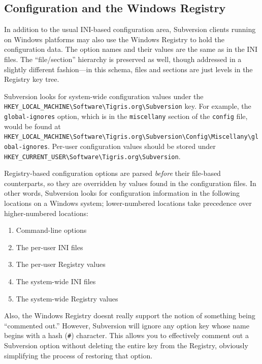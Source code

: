 \subsection{Configuration and the Windows
Registry}\label{svn.advanced.confarea.windows-registry}

In addition to the usual INI-based configuration area, Subversion
clients running on Windows platforms may also use the Windows Registry
to hold the configuration data. The option names and their values are
the same as in the INI files. The ``file/section'' hierarchy is
preserved as well, though addressed in a slightly different fashion---in
this schema, files and sections are just levels in the Registry key
tree.

Subversion looks for system-wide configuration values under the
\texttt{HKEY\_LOCAL\_MACHINE\textbackslash{}Software\textbackslash{}Tigris.org\textbackslash{}Subversion}
key. For example, the \texttt{global-ignores} option, which is in the
\texttt{miscellany} section of the \texttt{config} file, would be found
at
\texttt{HKEY\_LOCAL\_MACHINE\textbackslash{}Software\textbackslash{}Tigris.org\textbackslash{}Subversion\textbackslash{}Config\textbackslash{}Miscellany\textbackslash{}global-ignores}.
Per-user configuration values should be stored under
\texttt{HKEY\_CURRENT\_USER\textbackslash{}Software\textbackslash{}Tigris.org\textbackslash{}Subversion}.

Registry-based configuration options are parsed \emph{before} their
file-based counterparts, so they are overridden by values found in the
configuration files. In other words, Subversion looks for configuration
information in the following locations on a Windows system;
lower-numbered locations take precedence over higher-numbered locations:

\begin{enumerate}
\def\labelenumi{\arabic{enumi}.}
\item
  Command-line options
\item
  The per-user INI files
\item
  The per-user Registry values
\item
  The system-wide INI files
\item
  The system-wide Registry values
\end{enumerate}

Also, the Windows Registry doesn\textquotesingle t really support the
notion of something being ``commented out.'' However, Subversion will
ignore any option key whose name begins with a hash (\texttt{\#})
character. This allows you to effectively comment out a Subversion
option without deleting the entire key from the Registry, obviously
simplifying the process of restoring that option.

